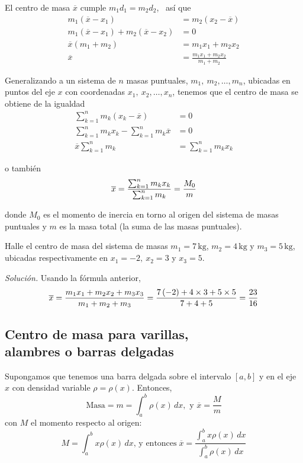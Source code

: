 El centro de masa $\overline{x}$ cumple $m_{1}d_{1}=m_{2}d_{2}$, \ así
que
\begin{align*}
m_{1}\left( \overline{x}-x_{1}\right) &=m_{2}\left( x_{2}-\overline{x}%
\right) \\
m_{1}\left( \overline{x}-x_{1}\right) +m_{2}\left(
\overline{x}-x_{2}\right) &=0\\
\overline{x}\left( m_{1}+m_{2}\right)
&=m_{1}x_{1}+m_{2}x_{2}\\
\overline{x}&=\frac{m_{1}x_{1}+m_{2}x_{2}}{  m_{1}+m_{2}}
\end{align*}

Generalizando a un sistema de $n$ masas puntuales, $m_1,\ m_2,\ldots,m_n$, ubicadas en puntos del eje
$x$ con coordenadas $x_1,\ x_2,\ldots, x_{n}$, tenemos que el centro de masa se
obtiene de la igualdad
\begin{align*}
\sum_{k=1}^{n}m_{k}\left( x_{k}-\overline{x}\right) &=0\\
\sum_{k=1}^{n}m_{k}x_{k}-\sum_{k=1}^{n}m_{k}\overline{x}&=0 \\
\overline{x}\sum_{k=1}^{n}m_{k}&=\sum_{k=1}^{n}m_{k}x_{k}
\end{align*}

o también
\[
\overline{x}=\frac{\sum_{k=1}^{n}m_{k}x_{k}}{\sum_{k=1}^{n}m_{k}}=\frac{%
M_{0}}{m}
\]

donde $M_{0}$ es el momento de inercia en torno al origen del sistema de masas puntuales y $m$ es la masa total (la suma de las masas puntuales).

\begin{ejemplo}
Halle el centro de masa del sistema de masas $m_{1}=7\,\text{kg}$, $m_{2}= 4\,\text{kg}$ y $m_{3}= 5\,\text{kg}$, ubicadas respectivamente en $x_{1}=-2,\ x_{2}=3$ y $x_{3}=5$.
\end{ejemplo}

\emph{Solución.} Usando la fórmula anterior,
\[
\overline{x}=\frac{m_{1}x_{1}+m_{2}x_{2}+m_{3}x_{3}}{%
m_{1}+m_{2}+m_{3}}=\frac{7\left( -2\right) +4\times 3+5\times 5}{7+4+5}=\frac{23}{16}
\]

\subsection[Centro de masa para varillas, alambres o barras delgadas]{Centro de masa para varillas,\\ alambres o barras delgadas}

Supongamos que tenemos una barra delgada sobre el intervalo $\left[ a,b\right] $ y
en el eje $x$ con densidad variable $\rho =\rho \left( x\right) $. Entonces,
\[
\text{Masa}=m=\int_{a}^{b}\rho \left( x\right)\,dx,\text{ y } \overline{x}=\frac{M}{m}
\]
con $M$ el momento respecto al origen:
\[
M=\int_{a}^{b}x\rho \left( x\right)\,dx \text{, y entonces}\; \overline{x}=\frac{\int_{a}^{b}x\rho \left( x\right)\,dx}{\int_{a}^{b}\rho  \left( x\right)\,dx}
\]

